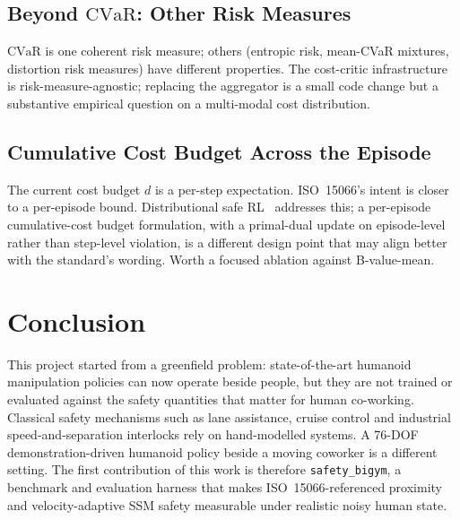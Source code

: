 \documentclass[11pt,a4paper]{report}
\newcommand{\ssm}{SSM}
\newcommand{\iso}{ISO~15066}
\newcommand{\cvar}{\ensuremath{\mathrm{CVaR}}}
\newcommand{\sbigym}{\texttt{safety\_bigym}}
\begin{document}
\section{Beyond \cvar{}: Other Risk Measures}
\label{sec:fw:risk-measures}

\cvar{} is one coherent risk measure; others (entropic risk,
mean-CVaR mixtures, distortion risk measures) have different
properties. The cost-critic infrastructure is risk-measure-agnostic;
replacing the aggregator is a small code change but a substantive
empirical question on a multi-modal cost distribution.

\section{Cumulative Cost Budget Across the Episode}
\label{sec:fw:cumulative}

The current cost budget $d$ is a per-step expectation. \iso{}'s
intent is closer to a per-episode bound. Distributional safe
RL~\cite{yang2021wcsac} addresses this; a per-episode cumulative-cost
budget formulation, with a primal-dual update on episode-level
rather than step-level violation, is a different design point that
may align better with the standard's wording. Worth a focused
ablation against B-value-mean.


\chapter{Conclusion}
\label{ch:conclusion}

\noindent
This project started from a greenfield problem: state-of-the-art
humanoid manipulation policies can now operate beside people, but they
are not trained or evaluated against the safety quantities that matter
for human co-working. Classical safety mechanisms such as lane
assistance, cruise control and industrial speed-and-separation
interlocks rely on hand-modelled systems. A 76-DOF demonstration-driven
humanoid policy beside a moving coworker is a different setting. The
first contribution of this work is therefore \sbigym{}, a benchmark and
evaluation harness that makes \iso{}-referenced proximity and
velocity-adaptive \ssm{} safety measurable under realistic noisy human
state.
\end{document}
